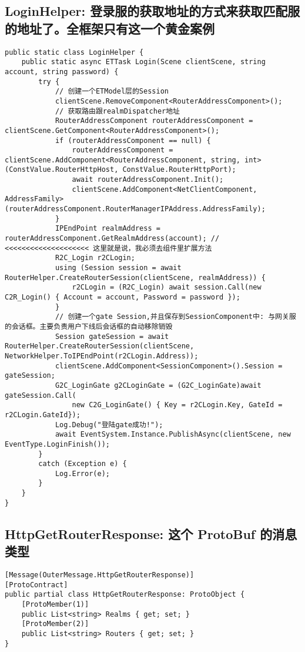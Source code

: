 \documentclass[9pt, b5paper]{article}
\begin{document}
\subsection{LoginHelper: 登录服的获取地址的方式来获取匹配服的地址了。全框架只有这一个黄金案例}
\label{sec-6-7}
\begin{verbatim}
public static class LoginHelper {
    public static async ETTask Login(Scene clientScene, string account, string password) {
        try {
            // 创建一个ETModel层的Session
            clientScene.RemoveComponent<RouterAddressComponent>();
            // 获取路由跟realmDispatcher地址
            RouterAddressComponent routerAddressComponent = clientScene.GetComponent<RouterAddressComponent>();
            if (routerAddressComponent == null) {
                routerAddressComponent = clientScene.AddComponent<RouterAddressComponent, string, int>(ConstValue.RouterHttpHost, ConstValue.RouterHttpPort);
                await routerAddressComponent.Init();
                clientScene.AddComponent<NetClientComponent, AddressFamily>(routerAddressComponent.RouterManagerIPAddress.AddressFamily);
            }
            IPEndPoint realmAddress = routerAddressComponent.GetRealmAddress(account); // <<<<<<<<<<<<<<<<<<<< 这里就是说，我必须去组件里扩展方法
            R2C_Login r2CLogin;
            using (Session session = await RouterHelper.CreateRouterSession(clientScene, realmAddress)) {
                r2CLogin = (R2C_Login) await session.Call(new C2R_Login() { Account = account, Password = password });
            }
            // 创建一个gate Session,并且保存到SessionComponent中: 与网关服的会话框。主要负责用户下线后会话框的自动移除销毁
            Session gateSession = await RouterHelper.CreateRouterSession(clientScene, NetworkHelper.ToIPEndPoint(r2CLogin.Address));
            clientScene.AddComponent<SessionComponent>().Session = gateSession;
            G2C_LoginGate g2CLoginGate = (G2C_LoginGate)await gateSession.Call(
                new C2G_LoginGate() { Key = r2CLogin.Key, GateId = r2CLogin.GateId});
            Log.Debug("登陆gate成功!");
            await EventSystem.Instance.PublishAsync(clientScene, new EventType.LoginFinish());
        }
        catch (Exception e) {
            Log.Error(e);
        }
    } 
}
\end{verbatim}
\subsection{HttpGetRouterResponse: 这个 ProtoBuf 的消息类型}
\label{sec-6-8}
\begin{verbatim}
[Message(OuterMessage.HttpGetRouterResponse)]
[ProtoContract]
public partial class HttpGetRouterResponse: ProtoObject {
    [ProtoMember(1)]
    public List<string> Realms { get; set; }
    [ProtoMember(2)]
    public List<string> Routers { get; set; }
}
\end{verbatim}
\end{document}
